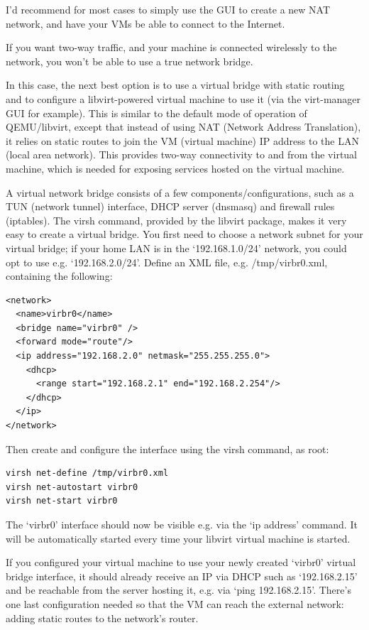 \documentclass[11pt]{article}
\begin{document}
I'd recommend for most cases to simply use the GUI to create a new NAT network, and have your VMs be able to connect to the Internet.

If you want two-way traffic, and your machine is connected wirelessly to the network, you won’t be able to use a true network bridge.

In this case, the next best option is to use a virtual bridge with static routing and to configure a libvirt-powered virtual machine to use it (via the virt-manager GUI for example). This is similar to the default mode of operation of QEMU/libvirt, except that instead of using NAT (Network Address Translation), it relies on static routes to join the VM (virtual machine) IP address to the LAN (local area network). This provides two-way connectivity to and from the virtual machine, which is needed for exposing services hosted on the virtual machine.

A virtual network bridge consists of a few components/configurations, such as a TUN (network tunnel) interface, DHCP server (dnsmasq) and firewall rules (iptables). The virsh command, provided by the libvirt package, makes it very easy to create a virtual bridge. You first need to choose a network subnet for your virtual bridge; if your home LAN is in the ‘192.168.1.0/24’ network, you could opt to use e.g. ‘192.168.2.0/24’. Define an XML file, e.g. /tmp/virbr0.xml, containing the following:

\begin{verbatim}
<network>
  <name>virbr0</name>
  <bridge name="virbr0" />
  <forward mode="route"/>
  <ip address="192.168.2.0" netmask="255.255.255.0">
    <dhcp>
      <range start="192.168.2.1" end="192.168.2.254"/>
    </dhcp>
  </ip>
</network>
\end{verbatim}

Then create and configure the interface using the virsh command, as root:

\begin{verbatim}
virsh net-define /tmp/virbr0.xml
virsh net-autostart virbr0
virsh net-start virbr0
\end{verbatim}

The ‘virbr0’ interface should now be visible e.g. via the ‘ip address’ command. It will be automatically started every time your libvirt virtual machine is started.

If you configured your virtual machine to use your newly created ‘virbr0’ virtual bridge interface, it should already receive an IP via DHCP such as ‘192.168.2.15’ and be reachable from the server hosting it, e.g. via ‘ping 192.168.2.15’. There’s one last configuration needed so that the VM can reach the external network: adding static routes to the network’s router.
\end{document}
